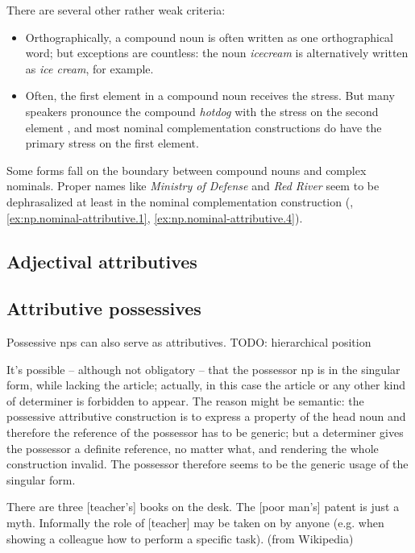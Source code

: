 \documentclass[UTF8, a4paper, oneside, scheme=plain, 12pt]{ctexbook}
\newcommand*{\citepage}[1]{p.~{#1}}
\newcommand{\form}[1]{\emph{#1}}
\begin{document}
There are several other rather weak criteria: 
\begin{itemize}
    \item Orthographically, a compound noun is often written as one orthographical word; 
        but exceptions are countless: 
        the noun \form{icecream} is alternatively written as \form{ice cream}, for example. 
    \item Often, the first element in a compound noun receives the stress.  
        But many speakers pronounce the compound \form{hotdog} 
        with the stress on the second element 
        \citep[\citepage{451}]{cgel}, 
        and most nominal complementation constructions do have the primary stress 
        on the first element.  
\end{itemize}
 
Some forms fall on the boundary between 
compound nouns and complex nominals.
Proper names like \form{Ministry of Defense} 
and \form{Red River} seem to be dephrasalized
at least in the nominal complementation construction
(, 
\ref{ex:np.nominal-attributive.1}, \ref{ex:np.nominal-attributive.4}). 

\subsection{Adjectival attributives}

\subsection{Attributive possessives}

Possessive \acs{np}s can also serve as attributives. TODO: hierarchical position 
\citep[\citepage{469}]{cgel}

It's possible -- although not obligatory -- 
that the possessor \acs{np} is in the singular form,
while lacking the article; 
actually, in this case the article or any other kind of determiner 
is forbidden to appear. 
The reason might be semantic: 
the possessive attributive construction 
is to express a property of the head noun 
and therefore the reference of the possessor has to be generic; 
but a determiner gives the possessor a definite reference, no matter what, 
and rendering the whole construction invalid. 
The possessor therefore seems to be the generic usage of the singular form.

\begin{exe}
    \ex There are three [teacher's] books on the desk.
    \ex The [poor man's] patent is just a myth.
    \ex Informally the role of [teacher] may be taken on by anyone (e.g. when showing a colleague how to perform a specific task). (from Wikipedia)
\end{exe}
\end{document}

